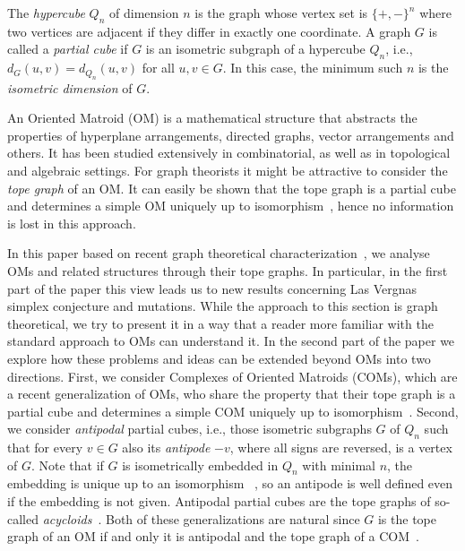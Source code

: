 \documentclass[final,11pt]{article}
\begin{document}

The \emph{hypercube} $Q_n$ of dimension $n$ is the graph whose vertex set is $\{+, -\}^n$ where two vertices are adjacent if they differ in exactly one coordinate.
A graph $G$ is called a \emph{partial cube} if $G$ is an isometric subgraph of a hypercube $Q_n$, i.e., $d_G(u,v)=d_{Q_n}(u,v)$ for all $u,v\in G$. In this case, the minimum such $n$ is the \emph{isometric dimension} of $G$.

An Oriented Matroid (OM) is a mathematical structure that abstracts the properties of hyperplane arrangements, directed graphs, vector arrangements and others. It has been studied extensively in combinatorial, as well as in topological and algebraic settings. For graph theorists it might be attractive to consider the \emph{tope graph} of an OM. It can easily be shown that the tope graph is a partial cube and determines a simple OM uniquely up to isomorphism~\cite{Bjo-90}, hence  no information is lost in this approach.

In this paper based on recent graph theoretical characterization~\cite{Kna-17}, we analyse OMs and related structures through their tope graphs. In particular, in the first part of the paper this view leads us to new results concerning Las Vergnas simplex conjecture and mutations. While the approach to this section is graph theoretical, we try to present it in a way that a reader more familiar with the standard approach to OMs can understand it. In the second part of the paper we explore how these problems and ideas can be extended beyond OMs into two directions. First, we consider Complexes of Oriented Matroids (COMs), which are a recent generalization of OMs, who share the property that their tope graph is a partial cube and determines a simple COM uniquely up to isomorphism~\cite{Ban-18}. Second, we consider \emph{antipodal} partial cubes, i.e., those isometric subgraphs $G$ of $Q_n$ such that for every $v\in G$ also its \emph{antipode} $-v$, where all signs are reversed, is a vertex of $G$. Note that if $G$ is isometrically embedded in $Q_n$ with minimal $n$, the embedding is unique up to an isomorphism ~\cite[Chapter 5]{Ovc-11}, so an antipode is well defined even if the embedding is not given. Antipodal partial cubes are the tope graphs of so-called \emph{acycloids}~\cite{Fuk-93}. Both of these generalizations are natural since $G$ is the tope graph of an OM if and only it is antipodal and the tope graph of a COM~\cite{Kna-17}.
\end{document}
